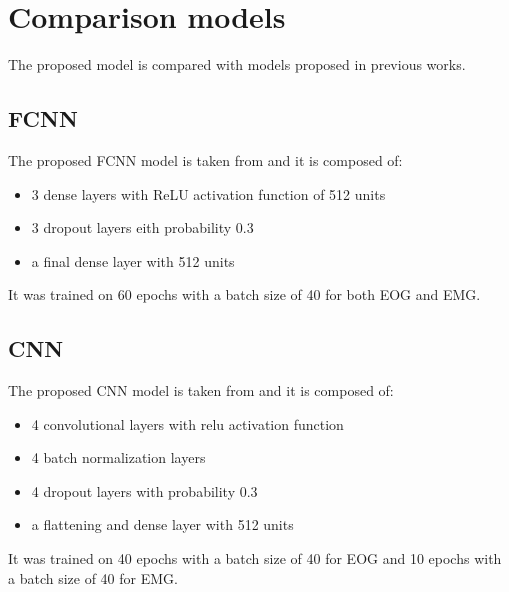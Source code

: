 \documentclass[a4paper]{sapthesis}
\begin{document}
\section{Comparison models}
The proposed model is compared with models proposed in previous works.
\subsection{FCNN}\label{sec:model_fcnn}
The proposed FCNN model is taken from\cite{EEGdenoiseNet} and it is 
composed of:
\begin{itemize}
\item 3 dense layers with ReLU activation function of 512 units
\item 3 dropout layers eith probability 0.3
\item a final dense layer with 512 units
\end{itemize}
It was trained on 60 epochs with a batch size of 40 for both EOG and EMG.
\subsection{CNN}\label{sec:model_cnn}
The proposed CNN model is taken from\cite{EEGdenoiseNet} and it is 
composed of: 
\begin{itemize}
\item 4 convolutional layers with relu activation function
\item 4 batch normalization layers
\item 4 dropout layers with probability 0.3
\item a flattening and dense layer with 512 units
\end{itemize}
It was trained on 40 epochs with a batch size of 40 for EOG and 
10 epochs with a batch size of 40 for EMG.
\end{document}
